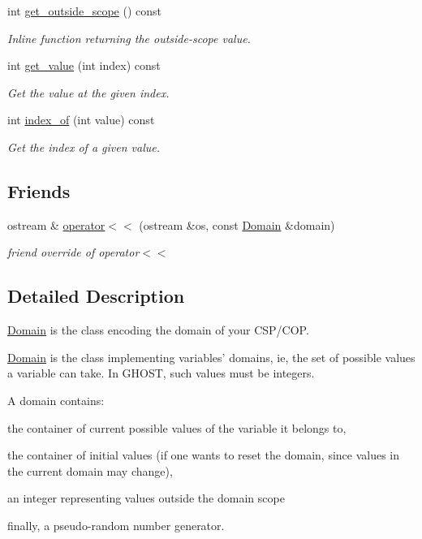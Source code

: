 \begin{DoxyCompactItemize}
int \hyperlink{classghost_1_1Domain_aaf4831cb947caf490c6133343cd3e569}{get\-\_\-outside\-\_\-scope} () const 
\begin{DoxyCompactList}\small\item\em Inline function returning the outside-\/scope value. \end{DoxyCompactList}\item 
int \hyperlink{classghost_1_1Domain_a6e50fc11a5ed2857fccb69f12c0fa07d}{get\-\_\-value} (int index) const 
\begin{DoxyCompactList}\small\item\em Get the value at the given index. \end{DoxyCompactList}\item 
int \hyperlink{classghost_1_1Domain_a1201d3b7c15381d19510a131d8823ff0}{index\-\_\-of} (int value) const 
\begin{DoxyCompactList}\small\item\em Get the index of a given value. \end{DoxyCompactList}\end{DoxyCompactItemize}
\subsection*{Friends}
\begin{DoxyCompactItemize}
\item 
ostream \& \hyperlink{classghost_1_1Domain_a608c9910828eb2983efb65ff4c297a4e}{operator$<$$<$} (ostream \&os, const \hyperlink{classghost_1_1Domain}{Domain} \&domain)
\begin{DoxyCompactList}\small\item\em friend override of operator$<$$<$ \end{DoxyCompactList}\end{DoxyCompactItemize}


\subsection{Detailed Description}
\hyperlink{classghost_1_1Domain}{Domain} is the class encoding the domain of your C\-S\-P/\-C\-O\-P. 

\hyperlink{classghost_1_1Domain}{Domain} is the class implementing variables' domains, ie, the set of possible values a variable can take. In G\-H\-O\-S\-T, such values must be integers.

A domain contains\-:
\begin{DoxyEnumerate}
\item the container of current possible values of the variable it belongs to,
\item the container of initial values (if one wants to reset the domain, since values in the current domain may change),
\item an integer representing values outside the domain scope
\item finally, a pseudo-\/random number generator. 
\end{DoxyEnumerate}

